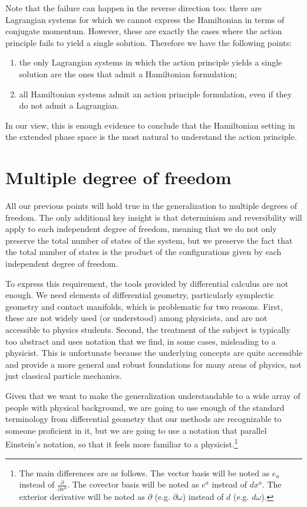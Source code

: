 \documentclass[10pt,twocolumn, nofootinbib]{revtex4-2}
\begin{document}
Note that the failure can happen in the reverse direction too: there are Lagrangian systems for which we cannot express the Hamiltonian in terms of conjugate momentum. However, these are exactly the cases where the action principle fails to yield a single solution. Therefore we have the following points:
\begin{enumerate}
	\item the only Lagrangian systems in which the action principle yields a single solution are the ones that admit a Hamiltonian formulation;
	\item all Hamiltonian systems admit an action principle formulation, even if they do not admit a Lagrangian.
\end{enumerate}

In our view, this is enough evidence to conclude that the Hamiltonian setting in the extended phase space is the most natural to understand the action principle.

\section{Multiple degree of freedom}

All our previous points will hold true in the generalization to multiple degrees of freedom. The only additional key insight is that determinism and reversibility will apply to each independent degree of freedom, meaning that we do not only preserve the total number of states of the system, but we preserve the fact that the total number of states is the product of the configurations given by each independent degree of freedom.

To express this requirement, the tools provided by differential calculus are not enough. We need elements of differential geometry, particularly symplectic geometry and contact manifolds, which is problematic for two reasons. First, these are not widely used (or understood) among physicists, and are not accessible to physics students. Second, the treatment of the subject is typically too abstract and uses notation that we find, in some cases, misleading to a physicist. This is unfortunate because the underlying concepts are quite accessible and provide a more general and robust foundations for many areas of physics, not just classical particle mechanics.

Given that we want to make the generalization understandable to a wide array of people with physical background, we are going to use enough of the standard terminology from differential geometry that our methods are recognizable to someone proficient in it, but we are going to use a notation that parallel Einstein's notation, so that it feels more familiar to a physicist.\footnote{The main differences are as follows. The vector basis will be noted as $e_a$ instead of $\frac{\partial}{\partial x^a}$. The covector basis will be noted as $e^a$ instead of $dx^a$. The exterior derivative will be noted as $\partial$ (e.g. $\partial \omega$) instead of $d$ (e.g. $d \omega$).}
\end{document}
